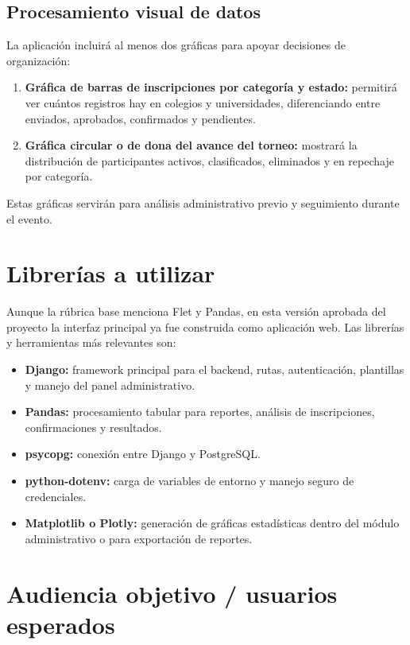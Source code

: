 \documentclass[12pt,a4paper]{article}
\begin{document}
\subsection{Procesamiento visual de datos}

La aplicación incluirá al menos dos gráficas para apoyar decisiones de organización:

\begin{enumerate}[leftmargin=1.2cm]
    \item \textbf{Gráfica de barras de inscripciones por categoría y estado:} permitirá ver cuántos registros hay en colegios y universidades, diferenciando entre enviados, aprobados, confirmados y pendientes.
    \item \textbf{Gráfica circular o de dona del avance del torneo:} mostrará la distribución de participantes activos, clasificados, eliminados y en repechaje por categoría.
\end{enumerate}

Estas gráficas servirán para análisis administrativo previo y seguimiento durante el evento.

\section{Librerías a utilizar}

Aunque la rúbrica base menciona Flet y Pandas, en esta versión aprobada del proyecto la interfaz principal ya fue construida como aplicación web. Las librerías y herramientas más relevantes son:

\begin{itemize}[leftmargin=1.2cm]
    \item \textbf{Django:} framework principal para el backend, rutas, autenticación, plantillas y manejo del panel administrativo.
    \item \textbf{Pandas:} procesamiento tabular para reportes, análisis de inscripciones, confirmaciones y resultados.
    \item \textbf{psycopg:} conexión entre Django y PostgreSQL.
    \item \textbf{python-dotenv:} carga de variables de entorno y manejo seguro de credenciales.
    \item \textbf{Matplotlib o Plotly:} generación de gráficas estadísticas dentro del módulo administrativo o para exportación de reportes.
\end{itemize}

\section{Audiencia objetivo / usuarios esperados}
\end{document}

